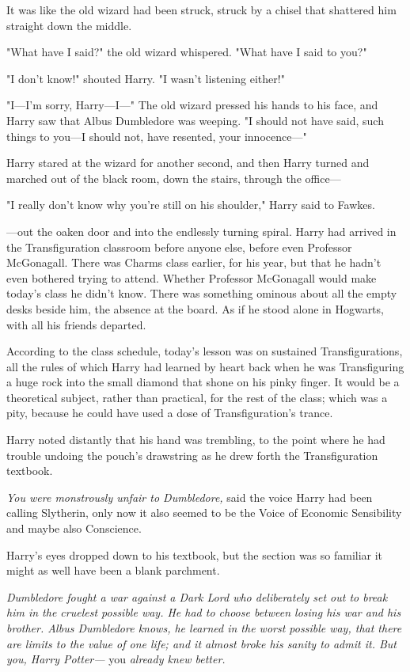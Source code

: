 It was like the old wizard had been struck, struck by a chisel that shattered 
him straight down the middle.

"What have I said?" the old wizard whispered. "What have I said to you?"

"I don't know!" shouted Harry. "I wasn't listening either!"

"I---I'm sorry, Harry---I---" The old wizard pressed his hands to his face, and 
Harry saw that Albus Dumbledore was weeping. "I should not have said, such 
things to you---I should not, have resented, your innocence---"

Harry stared at the wizard for another second, and then Harry turned and 
marched out of the black room, down the stairs, through the office---

"I really don't know why you're still on his shoulder," Harry said to Fawkes.

---out the oaken door and into the endlessly turning spiral.
\sbreak
Harry had arrived in the Transfiguration classroom before anyone else, before 
even Professor McGonagall. There was Charms class earlier, for his year, but 
that he hadn't even bothered trying to attend. Whether Professor McGonagall 
would make today's class he didn't know. There was something ominous about all 
the empty desks beside him, the absence at the board. As if he stood alone in 
Hogwarts, with all his friends departed.

According to the class schedule, today's lesson was on sustained 
Transfigurations, all the rules of which Harry had learned by heart back when 
he was Transfiguring a huge rock into the small diamond that shone on his pinky 
finger. It would be a theoretical subject, rather than practical, for the rest 
of the class; which was a pity, because he could have used a dose of 
Transfiguration's trance.

Harry noted distantly that his hand was trembling, to the point where he had 
trouble undoing the pouch's drawstring as he drew forth the Transfiguration 
textbook.

\emph{You were monstrously unfair to Dumbledore,} said the voice Harry had been 
calling Slytherin, only now it also seemed to be the Voice of Economic 
Sensibility and maybe also Conscience.

Harry's eyes dropped down to his textbook, but the section was so familiar it 
might as well have been a blank parchment.

\emph{Dumbledore fought a war against a Dark Lord who deliberately set out to 
break him in the cruelest possible way. He had to choose between losing his war 
and his brother. Albus Dumbledore knows, he learned in the worst possible way, 
that there are limits to the value of one life; and it almost broke his sanity 
to admit it. But you, Harry Potter---} you\emph{ already knew better.}

